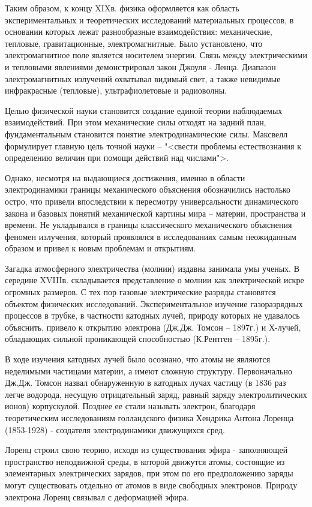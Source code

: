 \documentclass[exam_answers.tex]{subfiles}
\begin{document}
Таким образом, к концу XIXв. физика оформляется как область
экспериментальных и теоретических исследований материальных процессов, в
основании которых лежат разнообразные взаимодействия: механические,
тепловые, гравитационные, электромагнитные. Было установлено, что
электромагнитное поле является носителем энергии. Связь между
электрическими и тепловыми явлениями демонстрировал закон Джоуля -
Ленца. Диапазон электромагнитных излучений охватывал видимый свет, а
также невидимые инфракрасные (тепловые), ультрафиолетовые и радиоволны.

Целью физической науки становится создание единой теории
наблюдаемых взаимодействий. При этом механические силы отходят на задний
план, фундаментальным становится понятие электродинамические силы.
Максвелл формулирует главную цель точной науки – "<свести проблемы
естествознания к определению величин при помощи действий над числами">.

Однако, несмотря на выдающиеся достижения, именно в области
электродинамики границы механического объяснения обозначились настолько
остро, что привели впоследствии к пересмотру универсальности динамического
закона и базовых понятий механической картины мира – материи, пространства
и времени.
Не укладывался в границы классического механического объяснения
феномен излучения, который проявлялся в исследованиях самым неожиданным
образом и привел к новым проблемам и открытиям.

Загадка атмосферного электричества (молнии) издавна занимала умы
ученых. В середине XVIIIв. складывается представление о молнии как
электрической искре огромных размеров. С тех пор газовые электрические
разряды становятся объектом физических исследований. Экспериментальное
изучение газоразрядных процессов в трубке, в частности катодных лучей,
природу которых не удавалось объяснить, привело к открытию электрона
(Дж.Дж. Томсон – 1897г.) и Х-лучей, обладающих сильной проникающей
способностью (К.Рентген – 1895г.).

В ходе изучения катодных лучей было осознано, что атомы не являются
неделимыми частицами материи, а имеют сложную структуру. Первоначально
Дж.Дж. Томсон назвал обнаруженную в катодных лучах частицу (в 1836 раз
легче водорода, несущую отрицательный заряд, равный заряду
электролитических ионов) корпускулой. Позднее ее стали называть электрон,
благодаря теоретическим исследованиям голландского физика Хендрика
Антона Лоренца (1853-1928) - создателя электродинамики движущихся сред.

Лоренц строил свою теорию, исходя из существования эфира -
заполняющей пространство неподвижной среды, в которой движутся атомы,
состоящие из элементарных электрических зарядов, при этом по его
предположению заряды могут существовать отдельно от атомов в виде
свободных электронов. Природу электрона Лоренц связывал с деформацией
эфира.
\end{document}
